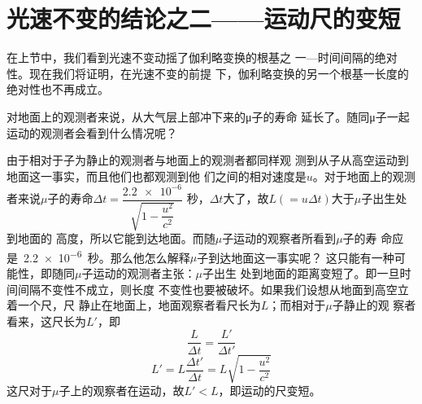 \section{光速不变的结论之二——运动尺的变短}\label{sec:02.08}

在上节中，我们看到光速不变动摇了伽利略变换的根基之
一—时间间隔的绝对性。现在我们将证明，在光速不变的前提
下，伽利略变换的另一个根基一长度的绝对性也不再成立。

对地面上的观测者来说，从大气层上部冲下来的μ子的寿命
延长了。随同μ子一起运动的观测者会看到什么情况呢？

由于相对于子为静止的观测者与地面上的观测者都同样观
测到从子从高空运动到地面这一事实，而且他们也都观测到他
们之间的相对速度是$u$。对于地面上的观测者来说$\mu$子的寿命$\Delta t = \dfrac{\num{2.2e-6}}{\sqrt{1 - \dfrac{u ^ 2}{c ^ 2}}}$
秒，$\Delta t$大了，故$ L ( = u \Delta t )$大于$\mu$子出生处到地面的
高度，所以它能到达地面。而随$\mu$子运动的观察者所看到$\mu$子的寿
命应是~\num{2.2e-6}~秒。那么他怎么解释$\mu$子到达地面这一事实呢？
这只能有一种可能性，即随同$\mu$子运动的观测者主张：$\mu$子出生
处到地面的距离变短了。即一旦时间间隔不变性不成立，则长度
不变性也要被破坏。如果我们设想从地面到高空立着一个尺，尺
静止在地面上，地面观察者看尺长为$L$；而相对于$\mu$子静止的观
察者看来，这尺长为$L'$，即
\begin{equation*}
    \frac { L } { \Delta t } = \frac { L ' } { \Delta t ' }
\end{equation*}
\begin{equation}\label{eqn:02.08.01}
    L ' = L \frac { \Delta t ' } { \Delta t } = L \sqrt { 1 - \frac { u ^ { 2 } }  { c ^ { 2 } } }
\end{equation}
这尺对于$\mu$子上的观察者在运动，故$ L ' < L  $，即运动的尺变短。

